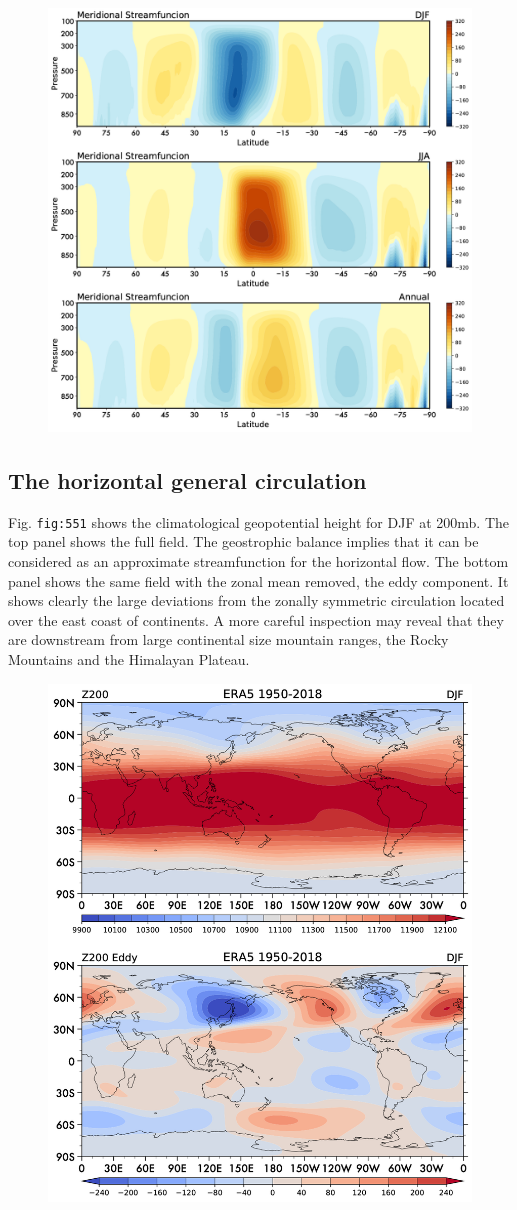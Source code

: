 \begin{figure}
\centering
\includegraphics[width = .7 \textwidth]{figs/GD/MSzonal.png}
\caption{}\label{}
\end{figure}

\subsection{The horizontal general
circulation}\label{the-horizontal-general-circulation}

Fig. \texttt{fig:551} shows the climatological geopotential height for
DJF at 200mb. The top panel shows the full field. The geostrophic
balance implies that it can be considered as an approximate
streamfunction for the horizontal flow. The bottom panel shows the same
field with the zonal mean removed, the eddy component. It shows clearly
the large deviations from the zonally symmetric circulation located over
the east coast of continents. A more careful inspection may reveal that
they are downstream from large continental size mountain ranges, the
Rocky Mountains and the Himalayan Plateau.

\begin{figure}
\centering
\includegraphics[width = .7 \textwidth]{figs/GD/Z200.png}
\caption{}\label{}
\end{figure}

